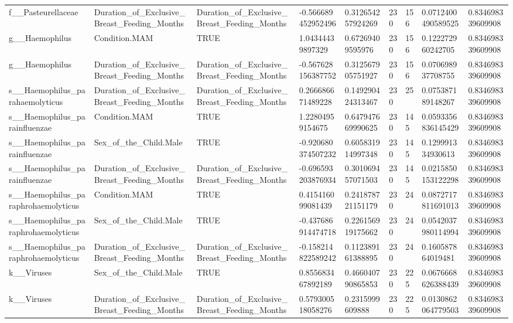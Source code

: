 \begin{longtable}{lllllllll}
f\_\_Pasteurellaceae & Duration\_of\_Exclusive\_Breast\_Feeding\_Months & Duration\_of\_Exclusive\_Breast\_Feeding\_Months & -0.566689452952496 & 0.312654257924269 & 230 & 156 & 0.0712400490589525 & 0.834698339609908 \\
g\_\_Haemophilus & Condition.MAM & TRUE & 1.04344439897329 & 0.67269409595976 & 230 & 156 & 0.122272960242705 & 0.834698339609908 \\
g\_\_Haemophilus & Duration\_of\_Exclusive\_Breast\_Feeding\_Months & Duration\_of\_Exclusive\_Breast\_Feeding\_Months & -0.567628156387752 & 0.312567905751927 & 230 & 156 & 0.070698937708755 & 0.834698339609908 \\
s\_\_Haemophilus\_parahaemolyticus & Duration\_of\_Exclusive\_Breast\_Feeding\_Months & Duration\_of\_Exclusive\_Breast\_Feeding\_Months & 0.266686671489228 & 0.149290424313467 & 230 & 25 & 0.075387189148267 & 0.834698339609908 \\
s\_\_Haemophilus\_parainfluenzae & Condition.MAM & TRUE & 1.22804959154675 & 0.647947669990625 & 230 & 145 & 0.0593356836145429 & 0.834698339609908 \\
s\_\_Haemophilus\_parainfluenzae & Sex\_of\_the\_Child.Male & TRUE & -0.920680374507232 & 0.605831914997348 & 230 & 145 & 0.129991334930613 & 0.834698339609908 \\
s\_\_Haemophilus\_parainfluenzae & Duration\_of\_Exclusive\_Breast\_Feeding\_Months & Duration\_of\_Exclusive\_Breast\_Feeding\_Months & -0.696593203876934 & 0.301069457071503 & 230 & 145 & 0.0215850153122298 & 0.834698339609908 \\
s\_\_Haemophilus\_paraphrohaemolyticus & Condition.MAM & TRUE & 0.415416099081439 & 0.241878721151179 & 230 & 24 & 0.0872717811691013 & 0.834698339609908 \\
s\_\_Haemophilus\_paraphrohaemolyticus & Sex\_of\_the\_Child.Male & TRUE & -0.437686914474718 & 0.226156919175662 & 230 & 24 & 0.0542037980114994 & 0.834698339609908 \\
s\_\_Haemophilus\_paraphrohaemolyticus & Duration\_of\_Exclusive\_Breast\_Feeding\_Months & Duration\_of\_Exclusive\_Breast\_Feeding\_Months & -0.158214822589242 & 0.112389161388895 & 230 & 24 & 0.160587864019481 & 0.834698339609908 \\
k\_\_Viruses & Sex\_of\_the\_Child.Male & TRUE & 0.855683467892189 & 0.466040790865853 & 230 & 225 & 0.0676668626388439 & 0.834698339609908 \\
k\_\_Viruses & Duration\_of\_Exclusive\_Breast\_Feeding\_Months & Duration\_of\_Exclusive\_Breast\_Feeding\_Months & 0.579300518058276 & 0.2315999609888 & 230 & 225 & 0.0130862064779503 & 0.834698339609908 \\

\end{longtable}
